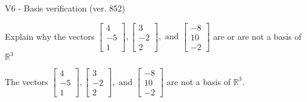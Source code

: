 \begin{exercise}
  \begin{exerciseTitle}V6 - Basis verification (ver. 852)\end{exerciseTitle}
  \begin{exerciseStatement}
    Explain why the vectors \(\left[\begin{array}{r}
4 \\
-5 \\
1
\end{array}\right] , \left[\begin{array}{r}
3 \\
-2 \\
2
\end{array}\right] , \text{ and } \left[\begin{array}{r}
-8 \\
10 \\
-2
\end{array}\right]\) are or are not a basis of \(\mathbb{R}^3\)	


  \end{exerciseStatement}
  \begin{exerciseAnswer}
   The vectors \(\left[\begin{array}{r}
4 \\
-5 \\
1
\end{array}\right] , \left[\begin{array}{r}
3 \\
-2 \\
2
\end{array}\right] , \text{ and } \left[\begin{array}{r}
-8 \\
10 \\
-2
\end{array}\right]\) 
  	 are not  a basis of \(\mathbb{R}^3\).
  


  \end{exerciseAnswer}
\end{exercise}